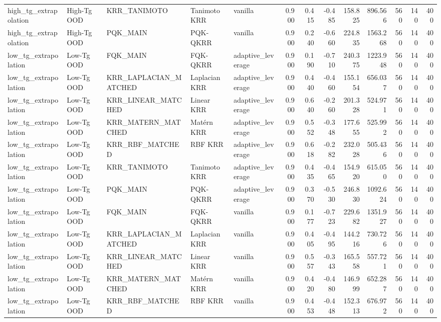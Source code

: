 \begin{tabular}{lllllrrrrrrrr}
high\_tg\_extrapolation & High-Tg OOD & KRR\_TANIMOTO & Tanimoto KRR & vanilla & 0.900 & 0.415 & -0.485 & 158.825 & 896.566 & 560 & 140 & 400 \\
high\_tg\_extrapolation & High-Tg OOD & PQK\_MAIN & PQK-QKRR & vanilla & 0.900 & 0.240 & -0.660 & 224.835 & 1563.268 & 560 & 140 & 400 \\
low\_tg\_extrapolation & Low-Tg OOD & FQK\_MAIN & FQK-QKRR & adaptive\_leverage & 0.900 & 0.190 & -0.710 & 240.375 & 1223.948 & 560 & 140 & 400 \\
low\_tg\_extrapolation & Low-Tg OOD & KRR\_LAPLACIAN\_MATCHED & Laplacian KRR & adaptive\_leverage & 0.900 & 0.440 & -0.460 & 155.154 & 656.037 & 560 & 140 & 400 \\
low\_tg\_extrapolation & Low-Tg OOD & KRR\_LINEAR\_MATCHED & Linear KRR & adaptive\_leverage & 0.900 & 0.640 & -0.260 & 201.328 & 524.971 & 560 & 140 & 400 \\
low\_tg\_extrapolation & Low-Tg OOD & KRR\_MATERN\_MATCHED & Matérn KRR & adaptive\_leverage & 0.900 & 0.552 & -0.348 & 177.655 & 525.992 & 560 & 140 & 400 \\
low\_tg\_extrapolation & Low-Tg OOD & KRR\_RBF\_MATCHED & RBF KRR & adaptive\_leverage & 0.900 & 0.618 & -0.282 & 232.028 & 505.436 & 560 & 140 & 400 \\
low\_tg\_extrapolation & Low-Tg OOD & KRR\_TANIMOTO & Tanimoto KRR & adaptive\_leverage & 0.900 & 0.435 & -0.465 & 154.920 & 615.050 & 560 & 140 & 400 \\
low\_tg\_extrapolation & Low-Tg OOD & PQK\_MAIN & PQK-QKRR & adaptive\_leverage & 0.900 & 0.370 & -0.530 & 246.830 & 1092.624 & 560 & 140 & 400 \\
low\_tg\_extrapolation & Low-Tg OOD & FQK\_MAIN & FQK-QKRR & vanilla & 0.900 & 0.177 & -0.723 & 229.682 & 1351.927 & 560 & 140 & 400 \\
low\_tg\_extrapolation & Low-Tg OOD & KRR\_LAPLACIAN\_MATCHED & Laplacian KRR & vanilla & 0.900 & 0.405 & -0.495 & 144.216 & 730.726 & 560 & 140 & 400 \\
low\_tg\_extrapolation & Low-Tg OOD & KRR\_LINEAR\_MATCHED & Linear KRR & vanilla & 0.900 & 0.557 & -0.343 & 165.558 & 557.721 & 560 & 140 & 400 \\
low\_tg\_extrapolation & Low-Tg OOD & KRR\_MATERN\_MATCHED & Matérn KRR & vanilla & 0.900 & 0.420 & -0.480 & 146.999 & 652.287 & 560 & 140 & 400 \\
low\_tg\_extrapolation & Low-Tg OOD & KRR\_RBF\_MATCHED & RBF KRR & vanilla & 0.900 & 0.453 & -0.448 & 152.313 & 676.972 & 560 & 140 & 400 \\

\end{tabular}
